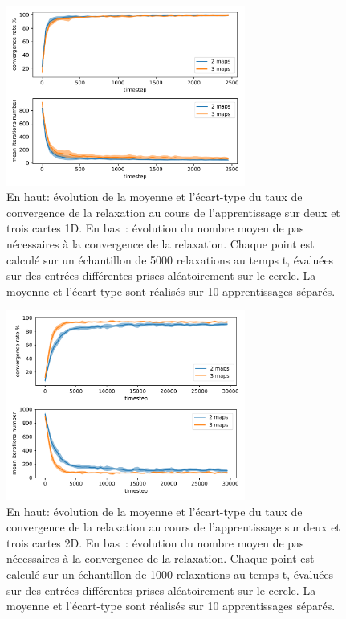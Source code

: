 \documentclass[../main]{subfiles}
\begin{document}
\begin{figure}
	\centering
	\includegraphics[width=0.7\textwidth]{1D_conv_evolution_total.pdf}
	\caption{En haut: évolution de la moyenne et l'écart-type du taux de convergence de la relaxation au cours de l'apprentissage sur deux et trois cartes 1D. En bas~: évolution du nombre moyen de pas nécessaires à la convergence de la relaxation.
	Chaque point est calculé sur un échantillon de 5000 relaxations au temps t, évaluées sur des entrées différentes prises aléatoirement sur le cercle. La moyenne et l'écart-type sont réalisés sur 10 apprentissages séparés.}
	\label{fig:conv_evolution}
	\end{figure}

\begin{figure}
	\centering
	\includegraphics[width=0.7\textwidth]{2D_conv_evolution_total.pdf}
	\caption{En haut: évolution de la moyenne et l'écart-type du taux de convergence de la relaxation au cours de l'apprentissage sur deux et trois cartes 2D. 
	En bas~: évolution du nombre moyen de pas nécessaires à la convergence de la relaxation.
	Chaque point est calculé sur un échantillon de 1000 relaxations au temps t, évaluées sur des entrées différentes prises aléatoirement sur le cercle. La moyenne et l'écart-type sont réalisés sur 10 apprentissages séparés.}
	\label{fig:conv_evolution2D}
	\end{figure}
\end{document}
